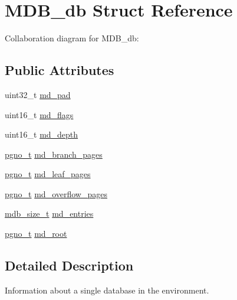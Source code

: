 \hypertarget{struct_m_d_b__db}{}\section{M\+D\+B\+\_\+db Struct Reference}
\label{struct_m_d_b__db}


Collaboration diagram for M\+D\+B\+\_\+db\+:
\subsection*{Public Attributes}
\begin{DoxyCompactItemize}
\item 
uint32\+\_\+t \mbox{\hyperlink{struct_m_d_b__db_a01ca7b28ab02c79ba76b64b32f23cc9a}{md\+\_\+pad}}
\item 
uint16\+\_\+t \mbox{\hyperlink{struct_m_d_b__db_a91a11c5c8034bd175eb0dd01da528981}{md\+\_\+flags}}
\item 
uint16\+\_\+t \mbox{\hyperlink{struct_m_d_b__db_a972437b5350a9306b3e0d6d315b3456a}{md\+\_\+depth}}
\item 
\mbox{\hyperlink{group__internal_gadb65f0424c9d3827bf6409087ad555cd}{pgno\+\_\+t}} \mbox{\hyperlink{struct_m_d_b__db_a656181db923d8349e54d051282e09ad3}{md\+\_\+branch\+\_\+pages}}
\item 
\mbox{\hyperlink{group__internal_gadb65f0424c9d3827bf6409087ad555cd}{pgno\+\_\+t}} \mbox{\hyperlink{struct_m_d_b__db_ad5d881546cdc62307869f6aa30b83be9}{md\+\_\+leaf\+\_\+pages}}
\item 
\mbox{\hyperlink{group__internal_gadb65f0424c9d3827bf6409087ad555cd}{pgno\+\_\+t}} \mbox{\hyperlink{struct_m_d_b__db_a2142ebea501d00b132d6d4fadf6fbd24}{md\+\_\+overflow\+\_\+pages}}
\item 
\mbox{\hyperlink{lmdb_8h_a78821971e612e3898ef4b3ae45ed86f1}{mdb\+\_\+size\+\_\+t}} \mbox{\hyperlink{struct_m_d_b__db_a4e29b63b778a67c89a3366c65ef312fa}{md\+\_\+entries}}
\item 
\mbox{\hyperlink{group__internal_gadb65f0424c9d3827bf6409087ad555cd}{pgno\+\_\+t}} \mbox{\hyperlink{struct_m_d_b__db_aa082a24262d25759cfbcf69a537f859a}{md\+\_\+root}}
\end{DoxyCompactItemize}


\subsection{Detailed Description}
Information about a single database in the environment. 

